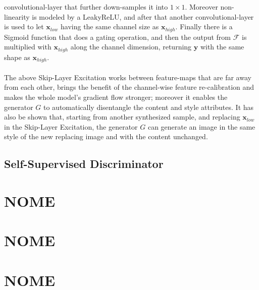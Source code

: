 \documentclass[12pt]{article}
\begin{document}
convolutional-layer that further down-samples it into $1 \times 1$. Moreover non-linearity is modeled by a LeakyReLU, and after that another 
convolutional-layer is used to let $\mathbf{x}_{low}$ having the same channel size as $\mathbf{x}_{high}$. Finally there is a Sigmoid function that
does a gating operation, and then the output from $\mathcal{F}$ is multiplied with $\mathbf{x}_{high}$ along the channel dimension, returning $\mathbf{y}$
with the same shape as $\mathbf{x}_{high}$.\\\\
The above Skip-Layer Excitation works between feature-maps that are far away from each other, brings the benefit of the channel-wise feature re-calibration 
and makes the whole model’s gradient flow stronger; moreover it enables the generator $G$ to automatically disentangle the content and style attributes.
It has also be shown that, starting from another synthesized sample, and replacing $\mathbf{x}_{low}$ in the Skip-Layer Excitation, the generator $G$ can generate an image
in the same style of the new replacing image and with the content unchanged. 

\subsection{Self-Supervised Discriminator}


\section{NOME}
\large



\section{NOME}
\large



\section{NOME}
\large


\end{document}
